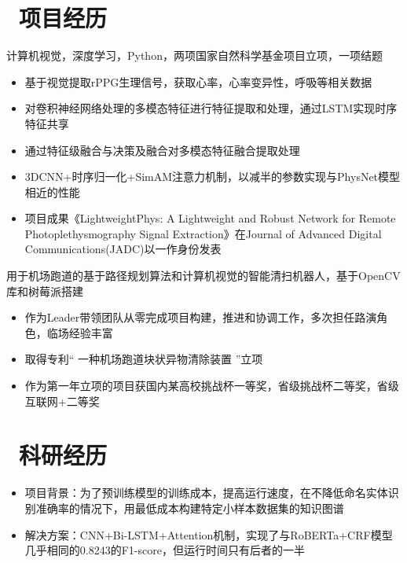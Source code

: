 \documentclass{resume}
\begin{document}
\section{\faUsers\ 项目经历}
计算机视觉，深度学习，Python，两项国家自然科学基金项目立项，一项结题
\begin{itemize}
  \item 基于视觉提取rPPG生理信号，获取心率，心率变异性，呼吸等相关数据
  \item 对卷积神经网络处理的多模态特征进行特征提取和处理，通过LSTM实现时序特征共享
  \item 通过特征级融合与决策及融合对多模态特征融合提取处理
  \item 3DCNN+时序归一化+SimAM注意力机制，以减半的参数实现与PhysNet模型相近的性能
  \item 项目成果《LightweightPhys: A Lightweight and Robust Network for Remote Photoplethysmography Signal Extraction》在Journal of Advanced Digital Communications(JADC)以一作身份发表
\end{itemize}

用于机场跑道的基于路径规划算法和计算机视觉的智能清扫机器人，基于OpenCV库和树莓派搭建
\begin{itemize}
  \item 作为Leader带领团队从零完成项目构建，推进和协调工作，多次担任路演角色，临场经验丰富
  \item 取得专利“ 一种机场跑道块状异物清除装置 ”立项
  \item 作为第一年立项的项目获国内某高校挑战杯一等奖，省级挑战杯二等奖，省级互联网+二等奖
\end{itemize}

\section{\faHeartO\ 科研经历}
\begin{itemize}
  \item 项目背景：为了预训练模型的训练成本，提高运行速度，在不降低命名实体识别准确率的情况下，用最低成本构建特定小样本数据集的知识图谱
  \item 解决方案：CNN+Bi-LSTM+Attention机制，实现了与RoBERTa+CRF模型几乎相同的0.8243的F1-score，但运行时间只有后者的一半
\end{itemize}
\end{document}
